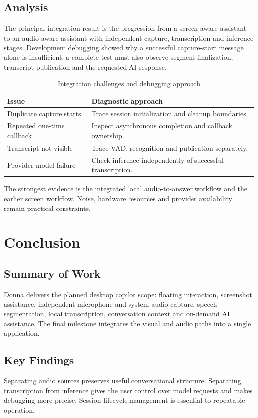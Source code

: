 \documentclass[openany]{tietreport}
\begin{document}
\section{Analysis}
The principal integration result is the progression from a screen-aware assistant to an audio-aware assistant with independent capture, transcription and inference stages. Development debugging showed why a successful capture-start message alone is insufficient: a complete test must also observe segment finalization, transcript publication and the requested AI response.
\begin{table}[htbp]\centering\small\begin{tabularx}{\linewidth}{@{}lX@{}}\toprule
Issue & Diagnostic approach \\ \midrule
Duplicate capture starts & Trace session initialization and cleanup boundaries. \\
Repeated one-time callback & Inspect asynchronous completion and callback ownership. \\
Transcript not visible & Trace VAD, recognition and publication separately. \\
Provider model failure & Check inference independently of successful transcription. \\
\bottomrule\end{tabularx}\caption{Integration challenges and debugging approach}\end{table}
The strongest evidence is the integrated local audio-to-answer workflow and the earlier screen workflow. Noise, hardware resources and provider availability remain practical constraints.
\chapter{Conclusion}
\section{Summary of Work}
Donna delivers the planned desktop copilot scope: floating interaction, screenshot assistance, independent microphone and system audio capture, speech segmentation, local transcription, conversation context and on-demand AI assistance. The final milestone integrates the visual and audio paths into a single application.
\section{Key Findings}
Separating audio sources preserves useful conversational structure. Separating transcription from inference gives the user control over model requests and makes debugging more precise. Session lifecycle management is essential to repeatable operation.
\end{document}
